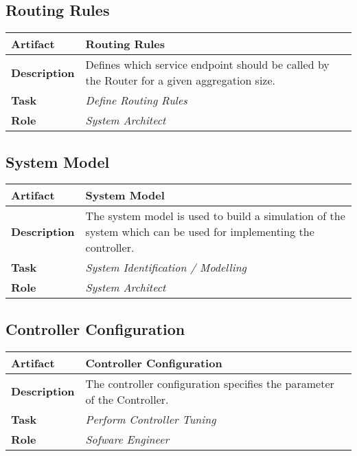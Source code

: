 \subsection{Routing Rules}

\begin{tabularx}{\textwidth}{@{} l X @{}}
	\caption{Routing Rules} \label{table:ch6_Artifact_Routing_Rules}\\
	\toprule 
	\bfseries Artifact & Routing Rules\\
	\midrule 
	\bfseries Description & Defines which service endpoint should be called by the Router for a given aggregation size.\\
	\midrule 
	\bfseries Task & \emph{Define Routing Rules}\\
	\midrule 
	\bfseries Role & \emph{System Architect}\\
	\bottomrule 
\end{tabularx}


\subsection{System Model}

\begin{tabularx}{\textwidth}{@{} l X @{}}
	\caption{System Model} \label{table:ch6_Artifact_System_Model}\\
	\toprule 
	\bfseries Artifact & System Model\\
	\midrule 
	\bfseries Description & The system model is used to build a simulation of the system which can be used for implementing the controller.\\
	\midrule 
	\bfseries Task & \emph{System Identification / Modelling}
	\\
	\midrule 
	\bfseries Role & \emph{System Architect}\\
	\bottomrule 
\end{tabularx}


\subsection{Controller Configuration}

\begin{tabularx}{\textwidth}{@{} l X @{}}
	\caption{Controller Configuration} \label{table:ch6_Artifact_Controller_Configuration}\\
	\toprule \bfseries Artifact & Controller Configuration\\
	\midrule 
	\bfseries Description & The controller configuration specifies the parameter of the Controller.\\
	\midrule 
	\bfseries Task & \emph{Perform Controller Tuning}
		\\
	\midrule 
	\bfseries Role & \emph{Sofware Engineer}\\
	\bottomrule 
\end{tabularx}


